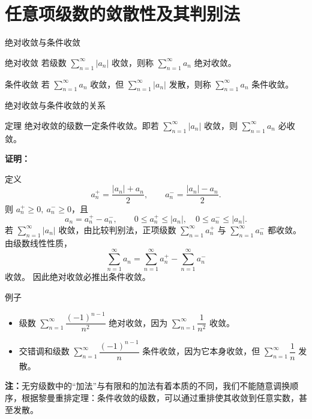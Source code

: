 \documentclass[aspectratio=169,10pt]{ctexbeamer}
\begin{document}
\section{任意项级数的敛散性及其判别法}

\begin{frame}{绝对收敛与条件收敛}
	\begin{block}{绝对收敛}
		若级数 \(\sum\limits_{n = 1}^{  \infty } |a_n|\) 收敛，则称 \(\sum\limits_{n = 1}^{  \infty } a_n\) 绝对收敛。
	\end{block}
	
	\vspace{0.8cm}
	
	\begin{block}{条件收敛}
		若 \(\sum\limits_{n = 1}^{  \infty } a_n\) 收敛，但 \(\sum\limits_{n = 1}^{  \infty } |a_n|\) 发散，则称 \(\sum\limits_{n = 1}^{  \infty } a_n\) 条件收敛。
	\end{block}
	
	
\end{frame}



\begin{frame}{绝对收敛与条件收敛的关系}
	\begin{block}{定理}
		绝对收敛的级数一定条件收敛。即若 \(\sum\limits_{n = 1}^{  \infty } |a_n|\) 收敛，则 \(\sum\limits_{n = 1}^{  \infty } a_n\) 必收敛。
	\end{block}

	
	\textbf{证明：}
	
	
		定义
	\[
	a_n^+=\frac{|a_n|+a_n}{2},\qquad a_n^-=\frac{|a_n|-a_n}{2}.
	\]
	则 $a_n^+\ge0,\ a_n^-\ge0$，且
	\[
	a_n=a_n^+-a_n^-,\qquad 0\le a_n^+\le |a_n|,\quad 0\le a_n^-\le |a_n|.
	\]
	若 $\sum\limits_{n = 1}^{  \infty } |a_n|$ 收敛，由比较判别法，正项级数 $\sum\limits_{n = 1}^{  \infty } a_n^+$ 与 $\sum\limits_{n = 1}^{  \infty } a_n^-$ 都收敛。 由级数线性性质，
	\[
	\sum_{n=1}^{\infty} a_n=\sum_{n=1}^{\infty} a_n^+-\sum_{n=1}^{\infty} a_n^-
	\]
	收敛。 因此绝对收敛必推出条件收敛。
\end{frame}


\begin{frame}
	\begin{block}{例子}
		\begin{itemize}
			\item 级数 \(\sum\limits_{n = 1}^{  \infty } \dfrac{(-1)^{n-1}}{n^2}\) 绝对收敛，因为 \(\sum\limits_{n = 1}^{  \infty } \dfrac{1}{n^2}\) 收敛。
			\item 交错调和级数 \(\sum\limits_{n = 1}^{  \infty } \dfrac{(-1)^{n-1}}{n}\) 条件收敛，因为它本身收敛，但 \(\sum\limits_{n = 1}^{  \infty } \dfrac{1}{n}\) 发散。
		\end{itemize}
	\end{block}
	
	\vspace{0.6cm}
	
\textbf{注：}无穷级数中的“加法”与有限和的加法有着本质的不同，我们不能随意调换顺序，根据黎曼重排定理：条件收敛的级数，可以通过重排使其收敛到任意实数，甚至发散。
	
\end{frame}
\end{document}
